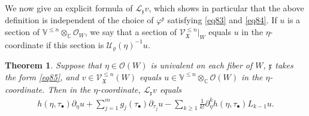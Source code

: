 \documentclass[12pt,b5paper,notitlepage]{report}
\theoremstyle{definition}
\theoremstyle{plain}
\newtheorem{thm}[df]{Theorem}
\newcommand{\fk}{\mathfrak}
\newcommand{\mc}{\mathcal}
\newcommand{\scr}{\mathscr}
\newcommand{\blt}{\bullet}
\newcommand{\Vbb}{\mathbb V}
\newcommand{\Cbb}{\mathbb C}
\numberwithin{equation}{section}
\begin{document}
We now give an explicit formula of $\mc L_{\fk x}v$, which shows in particular that the above definition is independent of the choice of $\varphi^{\fk x}$ satisfying \eqref{eq83} and \eqref{eq84}. If $u$ is a section of $\Vbb^{\leq n}\otimes_{\Cbb}\scr O_{W}$, we say that a section of $\scr V_{\fk X}^{\leq n}|_W$ equals $u$ in the $\eta$-coordinate if this section is $\mc U_\varrho(\eta)^{-1}u$. 




\begin{thm}\label{lb53}
Suppose that $\eta\in\scr O(W)$ is univalent on each fiber of $W$, $\fk x$ takes the form \eqref{eq85}, and $v\in\scr V_{\fk X}^{\leq n}(W)$ equals $u\in\Vbb^{\leq n}\otimes_{\Cbb}\scr O(W)$ in the $\eta$-coordinate. Then in the $\eta$-coordinate,  $\mc L_{\fk x}v$ equals
\begin{align}
h(\eta,\tau_\blt)\partial_\eta u+\sum_{j=1}^m g_j(\tau_\blt)\partial_{\tau_j}u-\sum_{k\geq 1}\frac 1{k!}\partial_\eta^k h(\eta,\tau_\blt)L_{k-1}u.\label{eq87}
\end{align}
\end{thm}	
\end{document}
